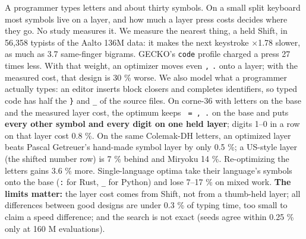 \documentclass{gecko-paper}
\begin{document}
\makepapertitle
\begin{paperabstract}
A programmer types letters and about thirty symbols. On a small split keyboard most symbols live on a layer, and how much a layer press costs decides where they go. No study measures it. We measure the nearest thing, a held Shift, in 56,358 typists of the Aalto 136M data: it makes the next keystroke $\times$1.78 slower, as much as 3.7 same-finger bigrams. GECKO's \texttt{code} profile charged a press 27
times less. With that weight, an optimizer moves even \texttt{,} \texttt{.} \texttt{\textquotesingle{}} onto a layer; with the measured cost, that design is 30 \% worse. We also model what a programmer actually types: an editor inserts block closers and completes identifiers, so typed code has half the \texttt{\}} and \texttt{\_} of the source files. On corne-36 with letters on the base and the
measured layer cost, the optimum keeps \texttt{\textquotesingle{}\ =\ ,\ .} on the base and puts \textbf{every other symbol and every digit on one held layer}; digits 1–0 in a row on that layer cost 0.8 \%. On the same Colemak-DH letters, an optimized layer beats Pascal Getreuer's hand-made symbol layer by only 0.5 \%; a US-style layer (the shifted number row) is 7 \% behind and Miryoku 14 \%.
Re-optimizing the letters gains 3.6 \% more. Single-language optima take their language's symbols onto the base (\texttt{:} for Rust, \texttt{\_} for Python) and lose 7–17 \% on mixed work. \textbf{The limits matter:} the layer cost comes from Shift, not from a thumb-held layer; all differences between good designs are under 0.3 \% of typing time, too small to claim a speed difference; and the
search is not exact (seeds agree within 0.25 \% only at 160 M evaluations).

\end{paperabstract}
\raggedright
\end{document}
